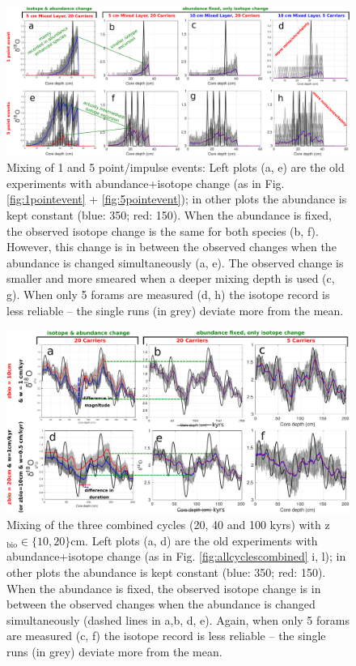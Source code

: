 \documentclass[a4paper,oneside,9pt]{article}
\begin{document}
\begin{figure}[hbp]
\begin{center}
	\includegraphics[width=1.0\textwidth]{../figures/../figures/JustABU_pointevent1+5.pdf}
	\caption{Mixing of 1 and 5 point/impulse events: Left plots (a, e) are the old experiments with abundance+isotope change (as in Fig. \ref{fig:1pointevent} + \ref{fig:5pointevent}); 
	in other plots the abundance is kept constant (blue: 350; red: 150). When the abundance is fixed, the observed isotope change is the same for both species (b, f). 
	However, this change is in between the observed changes when the abundance is changed simultaneously (a, e). The observed change is smaller and more smeared when a deeper mixing depth is used (c, g). 
	When only 5 forams are measured (d, h) the isotope record is less reliable -- the single runs (in grey) deviate more from the mean.
	}\label{fig:JustAbu_1+5pointevent}
\end{center}
\end{figure}



\begin{figure}[hbp]
\begin{center}
	\includegraphics[width=1.0\textwidth]{../figures/../figures/JustABU_3ycles_combined.pdf}
	\caption{Mixing of the three combined cycles (20, 40 and 100 kyrs) with z$_\mathrm{bio} \in \{10,20 \}$cm. 
	Left plots (a, d) are the old experiments with abundance+isotope change (as in Fig. \ref{fig:allcyclescombined} i, l); 
	in other plots the abundance is kept constant (blue: 350; red: 150). When the abundance is fixed, the observed isotope change is in between the observed changes when the abundance is changed simultaneously (dashed lines in a,b, d, e). 
	Again, when only 5 forams are measured (c, f) the isotope record is less reliable -- the single runs (in grey) deviate more from the mean.}\label{fig:xxx5pointevent}
\end{center}
\end{figure}
\end{document}
